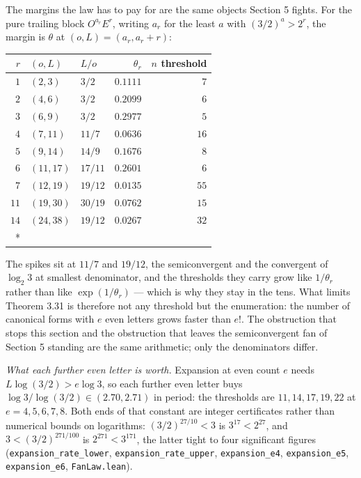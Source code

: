 \documentclass[12pt]{article}
\begin{document}
The margins the law has to pay for are the same objects Section 5
fights. For the pure trailing block \(O^{a_r}E^{r}\), writing \(a_r\)
for the least \(a\) with \((3/2)^{a}>2^{r}\), the margin is \(\theta\)
at \((o,L)=(a_r,a_r+r)\):

\begingroup\small

\begin{longtable}[]{@{}rllrr@{}}
\toprule\noalign{}
\(r\) & \((o,L)\) & \(L/o\) & \(\theta_r\) & \(n\) threshold \\
\midrule\noalign{}
\endhead
\bottomrule\noalign{}
\endfoot
\bottomrule\noalign{}
\endlastfoot
\(1\) & \((2,3)\) & \(3/2\) & \(0.1111\) & \(7\) \\
\(2\) & \((4,6)\) & \(3/2\) & \(0.2099\) & \(6\) \\
\(3\) & \((6,9)\) & \(3/2\) & \(0.2977\) & \(5\) \\
\(4\) & \((7,11)\) & \(11/7\) & \(0.0636\) & \(16\) \\
\(5\) & \((9,14)\) & \(14/9\) & \(0.1676\) & \(8\) \\
\(6\) & \((11,17)\) & \(17/11\) & \(0.2601\) & \(6\) \\
\(7\) & \((12,19)\) & \(19/12\) & \(0.0135\) & \(55\) \\
\(11\) & \((19,30)\) & \(30/19\) & \(0.0762\) & \(15\) \\
\(14\) & \((24,38)\) & \(19/12\) & \(0.0267\) & \(32\) \\*
\end{longtable}

\endgroup

The spikes sit at \(11/7\) and \(19/12\), the semiconvergent and the
convergent of \(\log_2 3\) at smallest denominator, and the thresholds
they carry grow like \(1/\theta_r\) rather than like
\(\exp(1/\theta_r)\) --- which is why they stay in the tens. What limits
Theorem 3.31 is therefore not any threshold but the enumeration: the
number of canonical forms with \(e\) even letters grows faster than
\(e!\). The obstruction that stops this section and the obstruction that
leaves the semiconvergent fan of Section 5 standing are the same
arithmetic; only the denominators differ.

\emph{What each further even letter is worth.} Expansion at even count
\(e\) needs \(L\log(3/2)>e\log3\), so each further even letter buys
\(\log3/\log(3/2)\in(2.70,2.71)\) in period: the thresholds are
\(11,14,17,19,22\) at \(e=4,5,6,7,8\). Both ends of that constant are
integer certificates rather than numerical bounds on logarithms:
\((3/2)^{27/10}<3\) is \(3^{17}<2^{27}\), and \(3<(3/2)^{271/100}\) is
\(2^{271}<3^{171}\), the latter tight to four significant figures
(\texttt{\nolinkurl{expansion_rate_lower}},
\texttt{\nolinkurl{expansion_rate_upper}},
\texttt{\nolinkurl{expansion_e4}}, \texttt{\nolinkurl{expansion_e5}},
\texttt{\nolinkurl{expansion_e6}}, \texttt{\nolinkurl{FanLaw.lean}}).
\end{document}
